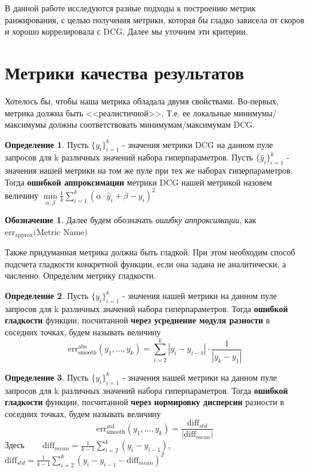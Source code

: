 \documentclass[14pt,a4paper]{amsart}
\theoremstyle{definition}
\newtheorem{definition}{Определение}[section]
\theoremstyle{definition}
\newtheorem{designation}{Обозначение}[section]
\newcommand{\Sum}{\sum\limits}
\renewcommand\i{\textit}
\renewcommand\t{\text}
\renewcommand\b{\textbf}
\begin{document}
В данной работе исследуются разные подходы к построению метрик ранжирования, с целью получения метрики, которая бы гладко зависела от скоров и хорошо коррелировала с DCG. Далее мы уточним эти критерии.\\


\newpage
\section{Метрики качества результатов}

Хотелось бы, чтобы наша метрика обладала двумя свойствами. Во-первых, метрика должна быть <<реалистичной>>. Т.е. ее локальные минимумы/максимумы должны соответствовать минимумам/максимумам DCG.
\begin{definition}
Пусть $\{y_i\}_{i=1}^k$ - значения метрики DCG на данном пуле запросов для k различных значений набора гиперпараметров. Пусть $\{\hat{y}_i\}_{i=1}^k$ - значения нашей метрики на том же пуле при тех же наборах гиперпараметров. Тогда \b{ошибкой аппроксимации} метрики DCG нашей метрикой назовем величину
$\underset{\alpha, \beta}{\min}\frac{1}{k}\Sum_{i=1}^k (\alpha\cdot \hat{y}_i + \beta - y_i)^2$
\end{definition}

\begin{designation}
Далее будем обозначать \i{ошибку аппроксимации}, как $\t{err}_\t{approx}\t{(Metric Name)}$
\end{designation}

Также придуманная метрика должна быть гладкой. При этом необходим способ подсчета гладкости конкретной функции, если она задана не аналитически, а численно. Определим метрику гладкости.

\begin{definition}
Пусть $\{y_i\}_{i=1}^k$ - значения нашей метрики на данном пуле запросов для k различных значений набора гиперпараметров. Тогда \b{ошибкой гладкости} функции, посчитанной \b{через усреднение модуля разности} в соседних точках, будем называть величину 
$$\t{err}_\t{smooth}^\t{abs}(y_1,\dots,y_k) = \Sum_{i=2}^k |y_i - y_{i-1}| \cdot \frac{1}{|y_k - y_1|}$$
\end{definition}

\begin{definition}
Пусть $\{y_i\}_{i=1}^k$ - значения нашей метрики на данном пуле запросов для k различных значений набора гиперпараметров. Тогда \b{ошибкой гладкости} функции, посчитанной \b{через нормировку дисперсии} разности в соседних точках, будем называть величину 
$$\t{err}_\t{smooth}^\t{std}(y_1,\dots,y_k) = \frac{\t{diff}_{std}}{|\t{diff}_{mean}|}$$
Здесь ~~~ $\t{diff}_{mean} = \frac{1}{k - 1} \Sum_{i=2}^k (y_i - y_{i-1})$, ~~~
$\t{diff}_{std} = \frac{1}{k - 1} \Sum_{i=2}^k (y_i - y_{i-1} - \t{diff}_{mean})^2$
\end{definition}
\end{document}
